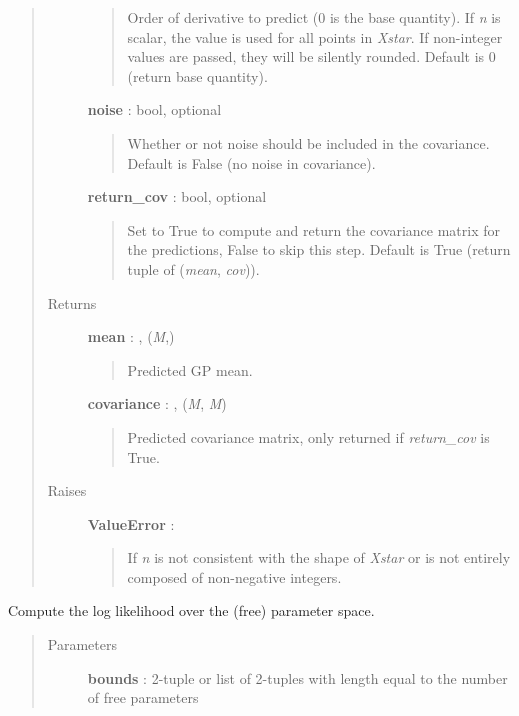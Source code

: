 \documentclass[letterpaper,10pt,english]{sphinxmanual}
\begin{document}
\begin{fulllineitems}
\begin{fulllineitems}
\begin{quote}
\begin{description}
\begin{quote}
Order of derivative to predict (0 is the base quantity). If \emph{n} is
scalar, the value is used for all points in \emph{Xstar}. If non-integer
values are passed, they will be silently rounded. Default is 0
(return base quantity).
\end{quote}

\textbf{noise} : bool, optional
\begin{quote}

Whether or not noise should be included in the covariance. Default
is False (no noise in covariance).
\end{quote}

\textbf{return\_cov} : bool, optional
\begin{quote}

Set to True to compute and return the covariance matrix for the
predictions, False to skip this step. Default is True (return tuple
of (\emph{mean}, \emph{cov})).
\end{quote}

\item[{Returns }] \leavevmode
\textbf{mean} : , (\emph{M},)
\begin{quote}

Predicted GP mean.
\end{quote}

\textbf{covariance} : , (\emph{M}, \emph{M})
\begin{quote}

Predicted covariance matrix, only returned if \emph{return\_cov} is True.
\end{quote}

\item[{Raises }] \leavevmode
\textbf{ValueError} :
\begin{quote}

If \emph{n} is not consistent with the shape of \emph{Xstar} or is not entirely
composed of non-negative integers.
\end{quote}

\end{description}\end{quote}

\end{fulllineitems}


\begin{fulllineitems}
\label{gptools:gptools.gaussian_process.GaussianProcess.compute_ll_matrix}
Compute the log likelihood over the (free) parameter space.
\begin{quote}\begin{description}
\item[{Parameters }] \leavevmode
\textbf{bounds} : 2-tuple or list of 2-tuples with length equal to the number of free parameters
\begin{quote}


\end{quote}
\end{description}
\end{quote}
\end{fulllineitems}
\end{fulllineitems}
\end{document}
